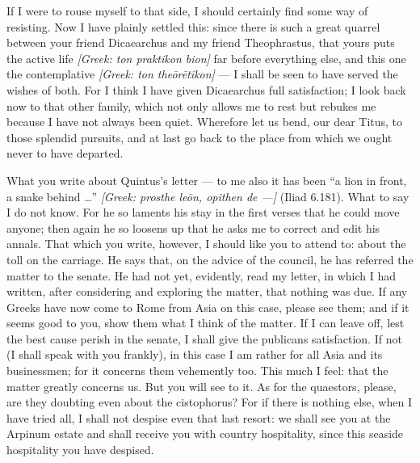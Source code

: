  If I were to rouse myself to that side, I should certainly find some way of resisting. Now I have plainly settled this: since there is such a great quarrel between your friend Dicaearchus and my friend Theophrastus, that yours puts the active life \textit{[Greek: ton praktikon bion]} far before everything else, and this one the contemplative \textit{[Greek: ton the\=or\=etikon]} --- I shall be seen to have served the wishes of both. For I think I have given Dicaearchus full satisfaction; I look back now to that other family, which not only allows me to rest but rebukes me because I have not always been quiet. Wherefore let us bend, our dear Titus, to those splendid pursuits, and at last go back to the place from which we ought never to have departed.

 What you write about Quintus's letter --- to me also it has been ``a lion in front, a snake behind \ldots'' \textit{[Greek: prosthe le\=on, opithen de ---]} (Iliad 6.181). What to say I do not know. For he so laments his stay in the first verses that he could move anyone; then again he so loosens up that he asks me to correct and edit his annals. That which you write, however, I should like you to attend to: about the toll on the carriage. He says that, on the advice of the council, he has referred the matter to the senate. He had not yet, evidently, read my letter, in which I had written, after considering and exploring the matter, that nothing was due. If any Greeks have now come to Rome from Asia on this case, please see them; and if it seems good to you, show them what I think of the matter. If I can leave off, lest the best cause perish in the senate, I shall give the publicans satisfaction. If not (I shall speak with you frankly), in this case I am rather for all Asia and its businessmen; for it concerns them vehemently too. This much I feel: that the matter greatly concerns us. But you will see to it. As for the quaestors, please, are they doubting even about the cistophorus? For if there is nothing else, when I have tried all, I shall not despise even that last resort: we shall see you at the Arpinum estate and shall receive you with country hospitality, since this seaside hospitality you have despised.
